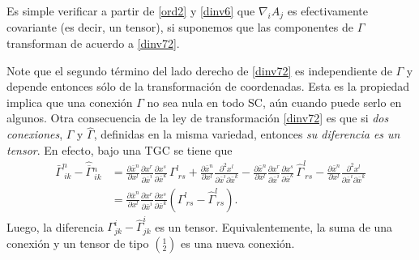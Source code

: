Es simple verificar a partir de \eqref{ord2} y \eqref{dinv6} que $\nabla_iA_j$ es efectivamente covariante (es decir, un tensor), si suponemos que las componentes de $\Gamma$ transforman de acuerdo a \eqref{dinv72}.

Note que el segundo término del lado derecho de \eqref{dinv72} es independiente de $\Gamma$ y depende entonces sólo de la transformación de coordenadas. Esta es la propiedad implica que una conexión $\Gamma$ no sea nula en todo SC, aún cuando puede serlo en algunos. Otra consecuencia de la ley de transformación \eqref{dinv72} es que si \textit{dos conexiones}, $\Gamma$ y $\hat{\Gamma}$, definidas en la misma variedad, entonces \textit{su diferencia es un tensor}. En efecto, bajo una TGC se tiene que
\begin{align}
\bar\Gamma_{\ ik}^n-\hat{\overline{\Gamma}}{}^n_{\ ik} & =\frac{\partial
\bar{x}^n}{\partial x^l}\frac{\partial x^r}{\partial\bar{x}^i}
\frac{\partial x^s}{\partial\bar{x}^k}\,\Gamma_{\ rs}^l +\frac{\partial
\bar{x}^n}{\partial x^l}\frac{\partial^2 x^l}{\partial\bar{x}^i \partial\bar{x}^k}-\frac{\partial\bar{x}^n}{\partial x^l}
\frac{\partial x^r}{\partial\bar{x}^i}\frac{\partial x^s}{\partial
\bar{x}^k}\,\hat{\Gamma}_{\ rs}^l -\frac{\partial\bar{x}^n}{\partial x^l}\frac{\partial^2 x^l}{\partial\bar{x}^i \partial\bar{x}^k}\label{dinv8}\\
& =\frac{\partial
\bar{x}^n}{\partial x^l}\frac{\partial x^r}{\partial\bar{x}^i}
\frac{\partial x^s}{\partial\bar{x}^k}\left( \Gamma_{\ rs}^l
-\hat{\Gamma}_{\ rs}^l \right) .\nonumber
\end{align}
Luego, la diferencia $\Gamma_{jk}^i -\hat{\Gamma}_{jk}^i $ es un tensor. Equivalentemente, la suma de una conexión y un tensor de tipo $(_2^1)$ es una nueva conexión.

